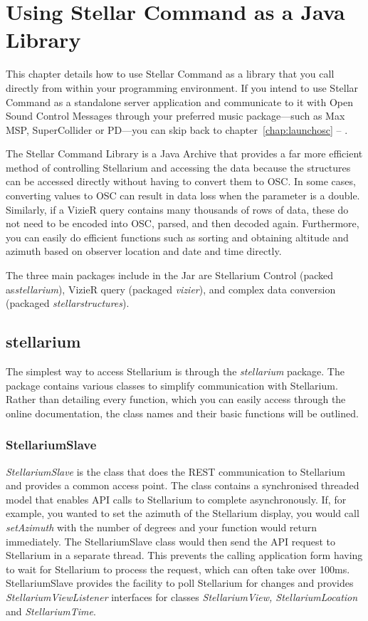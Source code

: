 \chapter{Using Stellar Command as a Java Library} \label{chap:libraryosc}
This chapter details how to use Stellar Command as a library that you call directly from within your programming environment.
If you intend to use Stellar Command as a standalone server application and communicate to it with Open Sound Control Messages through your preferred music package---such as Max MSP, SuperCollider or PD---you can skip back to chapter~\ref{chap:launchosc} --
\emph{}.

The Stellar Command Library is a Java Archive that provides a far more efficient method of controlling Stellarium and accessing the data because the structures can be accessed directly without having to convert them to OSC. In some cases, converting values to OSC  can result in  data loss when the parameter is a double. Similarly, if a VizieR query contains many thousands of rows of data, these do not need to be encoded into OSC, parsed, and then decoded again. Furthermore, you can easily do efficient functions such as sorting and obtaining altitude and azimuth based on observer location and date and time directly.

The three main packages include in the Jar are Stellarium Control (packed as\textit{stellarium}), VizieR query (packaged \textit{vizier}), and complex data conversion (packaged \textit{stellarstructures}).

\section{stellarium}
The simplest way to access Stellarium is through the \textit{stellarium} package. The package contains various classes to simplify communication with Stellarium. Rather than detailing every function, which you can easily access through the online documentation, the class names and their basic functions will be outlined.
\subsection{StellariumSlave}

\textit{StellariumSlave} is the class that does the REST communication to Stellarium and provides a common access point. The class contains a synchronised threaded model that enables API calls to Stellarium to complete asynchronously. If, for example, you wanted to set the azimuth of the Stellarium display, you would call \textit{setAzimuth} with the number of degrees and your function would return immediately. The StellariumSlave class would then send the API request to Stellarium in a separate thread. This prevents the calling application form having to wait for Stellarium to process the request, which can often take over 100ms. 
StellariumSlave provides the facility to poll Stellarium for changes and provides \textit{StellariumViewListener} interfaces for classes \textit{StellariumView, StellariumLocation} and \textit{StellariumTime}.

